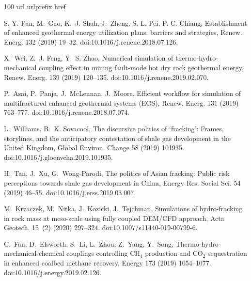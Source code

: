 \documentclass[3p,times]{elsarticle}
\theoremstyle{plain}
\begin{document}
\begin{thebibliography}{100}
\expandafter\ifx\csname url\endcsname\relax
  \def\url#1{\texttt{#1}}\fi
\expandafter\ifx\csname urlprefix\endcsname\relax\def\urlprefix{URL }\fi
\expandafter\ifx\csname href\endcsname\relax
  \def\href#1#2{#2} \def\path#1{#1}\fi

S.-Y. Pan, M.~Gao, K.~J. Shah, J.~Zheng, S.-L. Pei, P.-C. Chiang,
  {Establishment of enhanced geothermal energy utilization plans: barriers and
  strategies}, Renew. Energ. 132 (2019) 19--32.
\newblock \href {https://doi.org/10.1016/j.renene.2018.07.126}
  {\path{doi:10.1016/j.renene.2018.07.126}}.

X.~Wei, Z.~J. Feng, Y.~S. Zhao, {Numerical simulation of
  thermo-hydro-mechanical coupling effect in mining fault-mode hot dry rock
  geothermal energy}, Renew. Energ. 139 (2019) 120--135.
\newblock \href {https://doi.org/10.1016/j.renene.2019.02.070}
  {\path{doi:10.1016/j.renene.2019.02.070}}.

P.~Asai, P.~Panja, J.~McLennan, J.~Moore, {Efficient workflow for simulation of
  multifractured enhanced geothermal systems (EGS)}, Renew. Energ. 131 (2019)
  763--777.
\newblock \href {https://doi.org/10.1016/j.renene.2018.07.074}
  {\path{doi:10.1016/j.renene.2018.07.074}}.

L.~Williams, B.~K. Sovacool, {The discursive politics of `fracking': Frames,
  storylines, and the anticipatory contestation of shale gas development in the
  United Kingdom}, Global Environ. Change 58 (2019) 101935.
\newblock \href {https://doi.org/10.1016/j.gloenvcha.2019.101935}
  {\path{doi:10.1016/j.gloenvcha.2019.101935}}.

H.~Tan, J.~Xu, G.~Wong-Parodi, {The politics of Asian fracking: Public risk
  perceptions towards shale gas development in China}, Energy Res. Social Sci.
  54 (2019) 46--55.
\newblock \href {https://doi.org/10.1016/j.erss.2019.03.007}
  {\path{doi:10.1016/j.erss.2019.03.007}}.

M.~Krzaczek, M.~Nitka, J.~Kozicki, J.~Tejchman, {Simulations of hydro-fracking
  in rock mass at meso-scale using fully coupled DEM/CFD approach}, Acta
  Geotech. 15~(2) (2020) 297--324.
\newblock \href {https://doi.org/10.1007/s11440-019-00799-6}
  {\path{doi:10.1007/s11440-019-00799-6}}.

C.~Fan, D.~Elsworth, S.~Li, L.~Zhou, Z.~Yang, Y.~Song,
  {Thermo-hydro-mechanical-chemical couplings controlling CH$_4$ production and
  CO$_2$ sequestration in enhanced coalbed methane recovery}, Energy 173 (2019)
  1054--1077.
\newblock \href {https://doi.org/10.1016/j.energy.2019.02.126}
  {\path{doi:10.1016/j.energy.2019.02.126}}.


\end{thebibliography}
\end{document}

